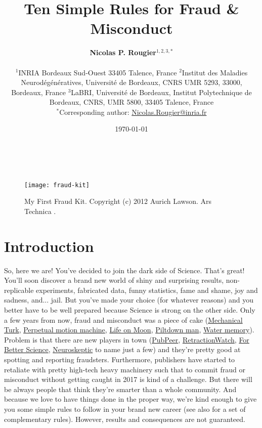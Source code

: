 \documentclass[a4paper,10pt,onecolumn]{article}
\title{Ten Simple Rules for Fraud \& Misconduct}
\author{%
  \textbf{Nicolas P. Rougier}$^{1,2,3,*}$\\
  \begin{footnotesize}
    $^{1}$INRIA Bordeaux Sud-Ouest
          33405 Talence, France
    $^{2}$Institut des Maladies Neurodégénératives,
          Université de Bordeaux, CNRS UMR 5293,
          33000, Bordeaux, France
    $^{3}$LaBRI, Université de Bordeaux, Institut Polytechnique de Bordeaux,
          CNRS, UMR 5800, 33405 Talence, France\\
    $^{*}$Corresponding author:
          \href{mailto:Nicolas.Rougier@inria.fr}{Nicolas.Rougier@inria.fr}
  \end{footnotesize}
}
\date{\today}
\makeatletter
\renewcommand{\maketitle}{\bgroup\setlength{\parindent}{0pt}
\begin{flushleft}
  \textbf{\huge\@title\\}
  \vspace{5mm}
  \@author
\end{flushleft}\egroup
}
\makeatother
\begin{document}
\maketitle


\begin{figure}[h]
  \begin{center}
    \noindent \texttt{[image: fraud-kit]}
  \end{center}
  \caption{My First Fraud Kit. Copyright (c) 2012 Aurich Lawson. Ars Technica
    \citep{timmer:2012}.}
\end{figure}

\section*{Introduction}

So, here we are! You've decided to join the dark side of Science. That's great!
You'll soon discover a brand new world of shiny and surprising results,
non-replicable experiments, fabricated data, funny statistics, fame and shame,
joy and sadness, and... jail. But you've made your choice (for whatever
reasons) and you better have to be well prepared because Science is strong on
the other side. Only a few years from now, fraud and misconduct was a piece of
cake (\href{https://en.wikipedia.org/wiki/The_Turk}{Mechanical Turk},
\href{https://en.wikipedia.org/wiki/Charles_Redheffer}{Perpetual motion
  machine}, \href{https://en.wikipedia.org/wiki/Great_Moon_Hoax}{Life on Moon},
\href{https://en.wikipedia.org/wiki/Piltdown_Man}{Piltdown man},
\href{https://en.wikipedia.org/wiki/Water_memory}{Water memory}). Problem is
that there are new players in town (\href{https://pubpeer.com}{PubPeer},
\href{http://retractionwatch.com}{RetractionWatch},
\href{https://forbetterscience.com}{For Better Science},
\href{http://blogs.discovermagazine.com/neuroskeptic/}{Neuroskeptic} to name
just a few) and they're pretty good at spotting and reporting fraudsters.
Furthermore, publishers have started to retaliate with pretty high-tech heavy
machinery such that to commit fraud or misconduct without getting caught in
2017 is kind of a challenge. But there will be always people that think they're
smarter than a whole community. And because we love to have things done in the
proper way, we're kind enough to give you some simple rules to follow in your
brand new career (see also \citep{timmer:2012} for a set of complementary
rules). However, results and consequences are not guaranteed.
\end{document}
